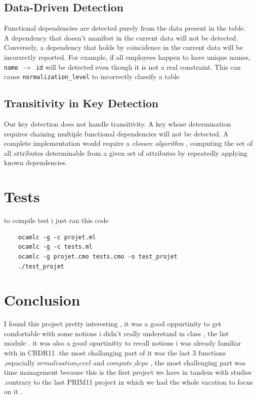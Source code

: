 \documentclass[11pt]{article}
\begin{document}
\subsection{Data-Driven Detection}
Functional dependencies are detected purely from the data present in the table. A dependency that doesn't manifest in the current data will not be detected. Conversely, a dependency that holds by coincidence in the current data will be incorrectly reported. For example, if all employees happen to have unique names, \texttt{name $\rightarrow$ id} will be detected even though it is not a real constraint. This can cause \texttt{normalization\_level} to incorrectly classify a table


\subsection{Transitivity in Key Detection}
Our key detection does not handle transitivity. A key whose determination requires chaining multiple functional dependencies will not be detected. A complete implementation would require a \textit{closure algorithm} , computing the set of all attributes determinable from a given set of attributes by repeatedly applying known dependencies.

\section{Tests}
to compile test i just ran this code 
\begin{lstlisting}
    ocamlc -g -c projet.ml
    ocamlc -g -c tests.ml
    ocamlc -g projet.cmo tests.cmo -o test_projet
    ./test_projet
\end{lstlisting}
\section{Conclusion}
I found this project pretty interesting , it was a good oppurtinity to get comfortable with some notions i didn't really understand in class , the list module . it was also a good opurtinitty to recall notions i was already familiar with in CBDR11 .the most challanging part of it was the last 3 functions ,espacially $ormalisation_level$ and $compute\_deps$ , the most challenging part was time management because this is the first project we have in tandem with studies .contrary to the last PRIM11 project in which we had the whole vacation to focus on it .
\end{document}
